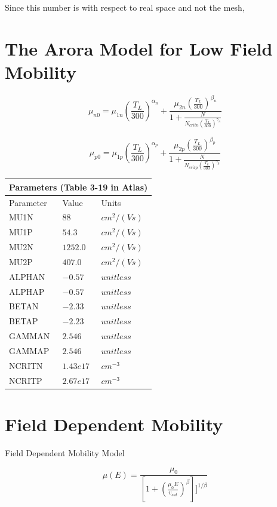 \documentclass[12pt]{article}
\begin{document}
Since this number is with respect to real space and not the mesh, 

\section{The Arora Model for Low Field Mobility \cite[p. 3-35]{Software1998}}
\[
\mu_{n0}=
\mu_{1n}(\frac{T_{L}}{300})^{\alpha_{n}}+
\frac{\mu_{2n}(\frac{T_{L}}{300})^{\beta_{n}}}
{1+
\frac{N}
{N_{critn}(\frac{T_{L}}{300})^{\gamma_{n}}}}
\]

\[
\mu_{p0}=
\mu_{1p}(\frac{T_{L}}{300})^{\alpha_{p}}+
\frac{\mu_{2p}(\frac{T_{L}}{300})^{\beta_{p}}}
{1+
	\frac{N}
	{N_{critp}(\frac{T_{L}}{300})^{\gamma_{p}}}}
\]


\begin{center}
	\begin{tabular}{ |p{3cm}|p{3cm}|p{3cm}| }
		\hline
		\multicolumn{3}{|c|}{Parameters (Table 3-19 in Atlas)} \\
		\hline
		Parameter&Value&Units\\
		\hline
		MU1N 	& $88$ 		& $cm^{2}/(Vs)$\\
		MU1P 	& $54.3$ 	& $cm^{2}/(Vs)$\\
		MU2N 	& $1252.0$ 	& $cm^{2}/(Vs)$\\
		MU2P 	& $407.0$ 	& $cm^{2}/(Vs)$\\
		ALPHAN 	& $-0.57$ 	& $unitless$\\
		ALPHAP 	& $-0.57$ 	& $unitless$\\
		BETAN 	& $-2.33$	& $unitless$\\
		BETAP 	& $-2.23$	& $unitless$\\
		GAMMAN 	& $2.546$ 	& $unitless$\\
		GAMMAP 	& $2.546$ 	& $unitless$\\
		NCRITN 	& $1.43e17$ & $cm^{-3}$\\
		NCRITP 	& $2.67e17$ & $cm^{-3}$\\
		\hline
	\end{tabular}
\end{center}



\section{Field Dependent Mobility}

Field Dependent Mobility Model

\[
\mu(E)=\frac{\mu_{0}}{[1+(\frac{\mu_{0}E}{v_{sat}})^{\beta}]]^{1/\beta}}
\]
\end{document}
